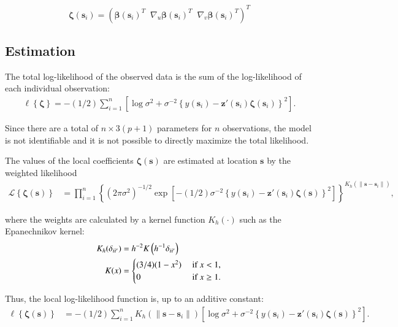 \documentclass[authoryear, review, 11pt]{elsarticle}
\begin{document}
    \begin{equation*}
        \bm{\zeta}(\bm{s}_i) = \left( \bm{\beta}(\bm{s}_i)^T \;\; \nabla_u \bm{\beta}(\bm{s}_i)^T \;\; \nabla_v \bm{\beta}(\bm{s}_i)^T \right)^T
    \end{equation*}
  
    \subsection{Estimation}		
    The total log-likelihood of the observed data is the sum of the log-likelihood of each individual observation:
    \begin{align} \label{eq:coefficients}
        \ell \left\{ \bm{\zeta} \right\} = -(1/2) \sum_{i=1}^n \left[ \log{ \sigma^2}  + \sigma^{-2}  \left\{ y(\bm{s}_i) - \bm{z}'(\bm{s}_i) \bm{\zeta}(\bm{s}_i) \right\}^2 \right].
	\end{align}
	
	Since there are a total of $n \times 3(p+1)$ parameters for $n$ observations, the model is not identifiable and it is not possible to directly maximize the total likelihood.
  
    The values of the local coefficients $\bm{\zeta}(\bm{s})$ are estimated at location $\bm{s}$ by the weighted likelihood
    \begin{align}\label{eq:local-likelihood}
		\mathcal{L} \left\{ \bm{\zeta}(\bm{s}) \right\} &= \prod_{i=1}^n \left\{ \left(2 \pi \sigma^2  \right)^{-1/2}  \exp \left[ -(1/2) \sigma^{-2}  \left\{ y(\bm{s}_i) - \bm{z}'(\bm{s}_i) \bm{\zeta}(\bm{s}) \right\}^2 \right] \right\} ^ {K_h( \| \bm{s} - \bm{s}_i \| )},
	\end{align}
  
    where the weights are calculated by a kernel function $K_h(\cdot)$ such as the Epanechnikov kernel:
    \begin{align}\label{eq:epanechnikov}
        K_h(\delta_{ii'}) &= h^{-2} K\left( h^{-1} \delta_{ii'} \right) \notag \\
        K(x) &= \begin{cases} (3/4) (1-x^2) &\mbox{ if } x < 1, \\ 0 &\mbox{ if } x \geq 1. \end{cases}
	\end{align}
  
    Thus, the local log-likelihood function is, up to an additive constant: 
    \begin{align}\label{eq:local-log-likelihood}
		\ell \left\{ \bm{\zeta}(\bm{s}) \right\} &= -(1/2) \sum_{i=1}^n K_h( \| \bm{s} - \bm{s}_i \| ) \left[ \log{\sigma^2}  + \sigma^{-2}  \left\{ y(\bm{s}_i) - \bm{z}'(\bm{s}_i) \bm{\zeta}(\bm{s}) \right\}^2 \right].
    \end{align}
  
\end{document}
